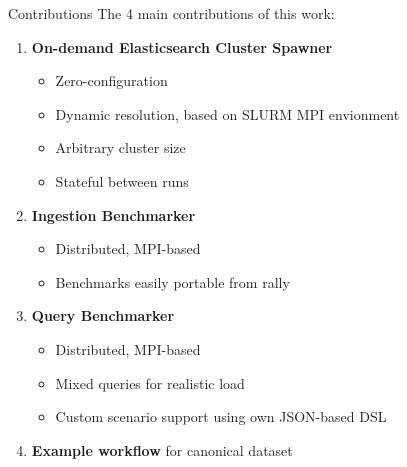 \documentclass[compress,aspectratio=169]{beamer}
\begin{document}
  \begin{frame}{Contributions}
    The 4 main contributions of this work:
    \pause
    \begin{enumerate}
      \item \textbf{On-demand Elasticsearch Cluster Spawner}
        \begin{itemize}
          \item Zero-configuration
          \item Dynamic resolution, based on SLURM MPI envionment
          \item Arbitrary cluster size
          \item Stateful between runs
        \end{itemize}
        \pause
      \item \textbf{Ingestion Benchmarker}
        \begin{itemize}
          \item Distributed, MPI-based
          \item Benchmarks easily portable from rally
        \end{itemize}
        \pause
      \item \textbf{Query Benchmarker}
        \begin{itemize}
          \item Distributed, MPI-based
          \item Mixed queries for realistic load
          \item Custom scenario support using own JSON-based DSL
        \end{itemize}
        \pause
      \item \textbf{Example workflow} for canonical dataset
    \end{enumerate}
  \end{frame}
\end{document}
